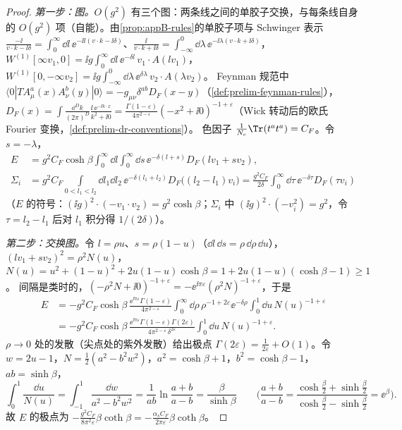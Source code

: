 \begin{proof}
\emph{第一步：图。}$O(g^2)$ 有三个图：两条线之间的单胶子交换，与每条线自身的 $O(g^2)$ 项（自能）。由\cref{prop:appB-rules}的单胶子项与 Schwinger 表示
$\frac{-\ii}{v\cdot k-\ii\delta}=\int_0^\infty\dd l\,\ee^{-\ii l(v\cdot k-\ii\delta)}$、$\frac{\ii}{v\cdot k+\ii\delta}=\int_{-\infty}^0\dd\lambda\,\ee^{-\ii\lambda(v\cdot k+\ii\delta)}$，
$W^{(1)}[\infty v_1,0]=\ii g\int_0^\infty\dd l\,\ee^{-\delta l}\,v_1\cdot A(lv_1)$，$W^{(1)}[0,-\infty v_2]=\ii g\int_{-\infty}^0\dd\lambda\,\ee^{\delta\lambda}\,v_2\cdot A(\lambda v_2)$。
Feynman 规范中 $\langle0|TA^a_\mu(x)A^b_\nu(y)|0\rangle=-g_{\mu\nu}\delta^{ab}D_F(x-y)$（\cref{def:prelim-feynman-rules}），
$D_F(x)=\int\frac{\dd^Dk}{(2\pi)^D}\frac{\ii\,\ee^{-\ii k\cdot x}}{k^2+\ii0}=\frac{\Gamma(1-\varepsilon)}{4\pi^{2-\varepsilon}}(-x^2+\ii0)^{-1+\varepsilon}$（Wick 转动后的欧氏 Fourier 变换，\cref{def:prelim-dr-conventions}）。
色因子 $\frac1{N_c}\Tr(t^at^a)=C_F$。令 $s=-\lambda$，
\[
\begin{aligned}
E&=g^2C_F\cosh\beta\int_0^\infty\!\dd l\int_0^\infty\!\dd s\,\ee^{-\delta(l+s)}D_F(lv_1+sv_2),\\
\Sigma_i&=g^2C_F\!\!\int\limits_{0<l_1<l_2}\!\!\dd l_1\dd l_2\,\ee^{-\delta(l_1+l_2)}D_F\big((l_2-l_1)v_i\big)=\frac{g^2C_F}{2\delta}\int_0^\infty\!\dd\tau\,\ee^{-\delta\tau}D_F(\tau v_i)
\end{aligned}
\]
（$E$ 的符号：$(\ii g)^2\cdot(-v_1\cdot v_2)=g^2\cosh\beta$；$\Sigma_i$ 中 $(\ii g)^2\cdot(-v_i^2)=g^2$，令 $\tau=l_2-l_1$ 后对 $l_1$ 积分得 $1/(2\delta)$）。

\emph{第二步：交换图。}令 $l=\rho u$、$s=\rho(1-u)$（$\dd l\,\dd s=\rho\,\dd\rho\,\dd u$），$(lv_1+sv_2)^2=\rho^2N(u)$，$N(u)=u^2+(1-u)^2+2u(1-u)\cosh\beta=1+2u(1-u)(\cosh\beta-1)\ge1$。
间隔是类时的，$(-\rho^2N+\ii0)^{-1+\varepsilon}=-\ee^{\ii\pi\varepsilon}(\rho^2N)^{-1+\varepsilon}$，于是
\[
\begin{aligned}
E&=-g^2C_F\cosh\beta\,\frac{\ee^{\ii\pi\varepsilon}\Gamma(1-\varepsilon)}{4\pi^{2-\varepsilon}}\int_0^\infty\!\dd\rho\,\rho^{-1+2\varepsilon}\ee^{-\delta\rho}\int_0^1\!\dd u\,N(u)^{-1+\varepsilon}\\
&=-g^2C_F\cosh\beta\,\frac{\ee^{\ii\pi\varepsilon}\Gamma(1-\varepsilon)\Gamma(2\varepsilon)}{4\pi^{2-\varepsilon}\,\delta^{2\varepsilon}}\int_0^1\!\dd u\,N(u)^{-1+\varepsilon}.
\end{aligned}
\]
$\rho\to0$ 处的发散（尖点处的紫外发散）给出极点 $\Gamma(2\varepsilon)=\frac1{2\varepsilon}+O(1)$。令 $w=2u-1$，$N=\frac12(a^2-b^2w^2)$，$a^2=\cosh\beta+1$，$b^2=\cosh\beta-1$，$ab=\sinh\beta$，
\[
\int_0^1\frac{\dd u}{N(u)}=\int_{-1}^{1}\frac{\dd w}{a^2-b^2w^2}=\frac{1}{ab}\ln\frac{a+b}{a-b}=\frac{\beta}{\sinh\beta}\qquad\Big(\frac{a+b}{a-b}=\frac{\cosh\frac\beta2+\sinh\frac\beta2}{\cosh\frac\beta2-\sinh\frac\beta2}=\ee^\beta\Big).
\]
故 $E$ 的极点为 $-\frac{g^2C_F}{8\pi^2\varepsilon}\beta\coth\beta=-\frac{\alpha_sC_F}{2\pi\varepsilon}\beta\coth\beta$。


\end{proof}
